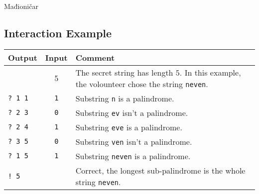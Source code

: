 \begin{statement}[
  problempoints=100,
  timelimit=5 seconds,
  memorylimit=512 MiB,
]{Mađioničar}
\subsection*{Interaction Example}
{\renewcommand{\arraystretch}{1.4}
  \setlength{\tabcolsep}{6pt}
  \begin{tabular}{lcl}
    Output & Input & Comment \\ \midrule
      & 5 & The secret string has length $5$. In this example, the volounteer chose the string \texttt{neven}. \\
    \texttt{\frenchspacing? 1 1} & \texttt{1} & Substring \texttt{n} is a palindrome. \\
    \texttt{\frenchspacing? 2 3} & \texttt{0} & Substring \texttt{ev} isn't a palindrome. \\
    \texttt{\frenchspacing? 2 4} & \texttt{1} & Substring \texttt{eve} is a palindrome. \\
    \texttt{\frenchspacing? 3 5} & \texttt{0} & Substring \texttt{ven} isn't a palindrome. \\
    \texttt{\frenchspacing? 1 5} & \texttt{1} & Substring \texttt{neven} is a palindrome. \\
    \texttt{\frenchspacing! 5} & & Correct, the longest sub-palindrome is the whole string \texttt{neven}. \\
\end{tabular}}


\end{statement}


